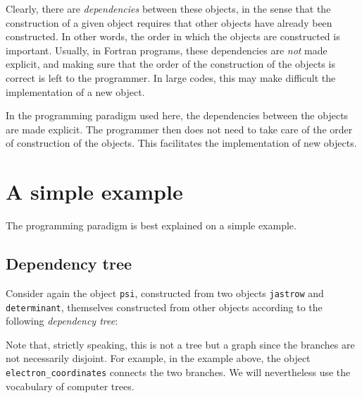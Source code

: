 \documentclass[a4paper,11pt]{article}
\begin{document}
Clearly, there are {\it dependencies} between these objects, in the sense that the construction of a given object requires that other objects have already been constructed. In other words, the order in which the objects are constructed is important. Usually, in Fortran programs, these dependencies are {\it not} made explicit, and making sure that the order of the construction of the objects is correct is left to the programmer. In large codes, this may make difficult the implementation of a new object.

In the programming paradigm used here, the dependencies between the objects are made explicit. The programmer then does not need to take care of the order of construction of the objects. This facilitates the implementation of new objects.

\section{A simple example}

The programming paradigm is best explained on a simple example. 

\subsection{Dependency tree}
Consider again the object {\tt psi}, constructed from two objects {\tt jastrow} and {\tt determinant}, themselves constructed from other objects according to the following {\it dependency tree}:


\begin{center}
\end{center}

Note that, strictly speaking, this is not a tree but a graph since the branches are not necessarily disjoint. For example, in the example above, the object {\tt electron\_coordinates} connects the two branches. We will nevertheless use the vocabulary of computer trees.
\end{document}
